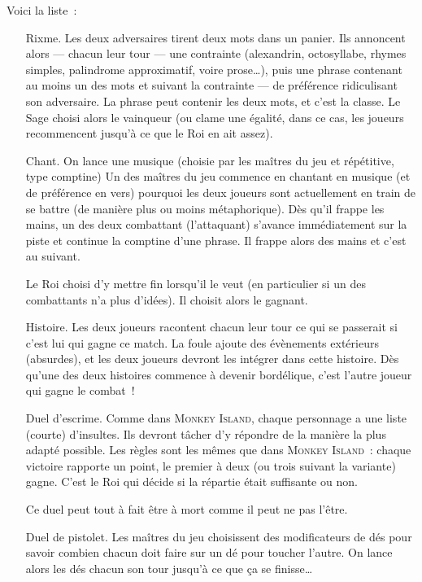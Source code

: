 {Voici la liste~:
\begin{itemize}
	\item[Rixme.]
		Les deux adversaires tirent deux mots dans un panier.
		Ils annoncent alors — chacun leur tour — une contrainte (alexandrin, octosyllabe, rhymes simples, palindrome approximatif, voire prose…), puis une phrase contenant au moins un des mots et suivant la contrainte — de préférence ridiculisant son adversaire.
		La phrase peut contenir les deux mots, et c’est la classe.
		Le Sage choisi alors le vainqueur (ou clame une égalité, dans ce cas, les joueurs recommencent jusqu’à ce que le Roi en ait assez).

	\item[Chant.]
		On lance une musique (choisie par les maîtres du jeu et répétitive, type comptine)
		Un des maîtres du jeu commence en chantant en musique (et de préférence en vers) pourquoi les deux joueurs sont actuellement en train de se battre (de manière plus ou moins métaphorique).
		Dès qu’il frappe les mains, un des deux combattant (l’attaquant) s’avance immédiatement sur la piste et continue la comptine d’une phrase.
		Il frappe alors des mains et c’est au suivant.

		Le Roi choisi d’y mettre fin lorsqu’il le veut (en particulier si un des combattants n’a plus d’idées).
		Il choisit alors le gagnant.

	\item[Histoire.]
		Les deux joueurs racontent chacun leur tour ce qui se passerait si c’est lui qui gagne ce match.
		La foule ajoute des évènements extérieurs (absurdes), et les deux joueurs devront les intégrer dans cette histoire.
		Dès qu’une des deux histoires commence à devenir bordélique, c’est l’autre joueur qui gagne le combat~!

	\item[Duel d’escrime.]
		Comme dans \textsc{Monkey Island}, chaque personnage a une liste (courte) d’insultes.
		Ils devront tâcher d’y répondre de la manière la plus adapté possible.
		Les règles sont les mêmes que dans \textsc{Monkey Island}~:  chaque victoire rapporte un point, le premier à deux (ou trois suivant la variante) gagne.
		C’est le Roi qui décide si la répartie était suffisante ou non.

		Ce duel peut tout à fait être à mort comme il peut ne pas l’être.

	\item[Duel de pistolet.]
		Les maîtres du jeu choisissent des modificateurs de dés pour savoir combien chacun doit faire sur un dé pour toucher l’autre.
		On lance alors les dés chacun son tour jusqu’à ce que ça se finisse…


\end{itemize}}
